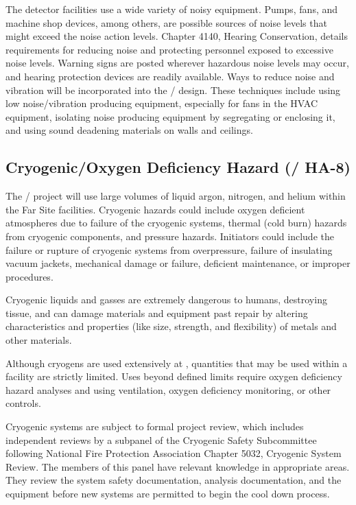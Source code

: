 The detector facilities use a wide variety of noisy equipment. Pumps,
fans, and machine shop devices, among others, are possible sources of
noise levels that might exceed the \fnal noise action
levels.  Chapter 4140, Hearing Conservation, details
requirements for reducing noise and protecting personnel exposed to
excessive noise levels. Warning signs are posted wherever hazardous
noise levels may occur, and hearing protection devices are readily
available. Ways to reduce noise and vibration will be incorporated
into the / design. These techniques include
using low noise/vibration producing equipment, especially for fans in
the HVAC equipment, isolating noise producing equipment by segregating
or enclosing it, and using sound deadening materials on walls and
ceilings.

\subsection{Cryogenic/Oxygen Deficiency Hazard (/ HA-8)}

The / project will use large volumes of liquid
argon, nitrogen, and helium within the Far Site facilities. Cryogenic
hazards could include oxygen deficient atmospheres due to failure of
the cryogenic systems, thermal (cold burn) hazards from cryogenic
components, and pressure hazards. Initiators could include the failure
or rupture of cryogenic systems from overpressure, failure of
insulating vacuum jackets, mechanical damage or failure, deficient
maintenance, or improper procedures.

Cryogenic liquids and gasses are extremely dangerous to humans,
destroying tissue, and can damage materials and equipment past repair
by altering characteristics and properties (like size, strength, and
flexibility) of metals and other materials.

Although cryogens are used extensively at \fnal, quantities that may
be used within a facility are strictly limited. Uses beyond defined
limits require oxygen deficiency hazard analyses and using
ventilation, oxygen deficiency monitoring, or other controls.

Cryogenic systems are subject to formal project review, which includes
independent reviews by a subpanel of the Cryogenic Safety Subcommittee
following National Fire Protection Association Chapter 5032, Cryogenic
System Review. The members of this panel have relevant knowledge in
appropriate areas. They review the system safety documentation,
 analysis documentation, and the equipment before new
systems are permitted to begin the cool down process.


